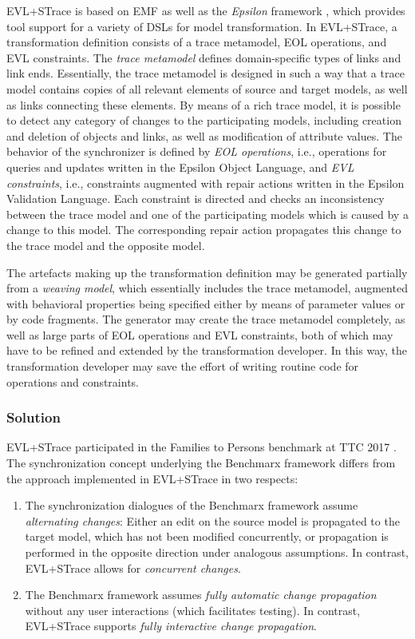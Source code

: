 EVL+STrace is based on EMF as well as the \emph{Epsilon} framework \cite{epsilon}, which provides tool support for a variety of DSLs for model transformation. In EVL+STrace, a transformation definition consists of a trace metamodel, EOL operations, and EVL constraints. The \emph{trace metamodel} defines domain-specific types of links and link ends. Essentially, the trace metamodel is designed in such a way that a trace model contains copies of all relevant elements of source and target models, as well as links connecting these elements. By means of a rich trace model, it is possible to detect any category of changes to the participating models, including creation and deletion of objects and links, as well as modification of attribute values. The behavior of the synchronizer is defined by \emph{EOL operations}, i.e., operations for queries and updates written in the Epsilon Object Language, and \emph{EVL constraints}, i.e., constraints augmented with repair actions written in the Epsilon Validation Language. Each constraint is directed and checks an inconsistency between the trace model and one of the participating models which is caused by a change to this model. The corresponding repair action propagates this change to the trace model and the opposite model.

The artefacts making up the transformation definition may be generated partially from a \emph{weaving model}, which essentially includes the trace metamodel, augmented with behavioral properties being specified either by means of parameter values or by code fragments. The generator may create the trace metamodel completely, as well as large parts of EOL operations and EVL constraints, both of which may have to be refined and extended by the transformation developer. In this way, the transformation developer may save the effort of writing routine code for operations and constraints.

\subsubsection{Solution}
\label{sec:solutionEVL}

EVL+STrace participated in the Families to Persons benchmark at TTC 2017 \cite{Samimi-Dehkordi2017}. The synchronization concept underlying the Benchmarx framework differs from the approach implemented in EVL+STrace in two respects:

\begin{enumerate}
	\item The synchronization dialogues of the Benchmarx framework assume \emph{alternating changes}: Either an edit on the source model is propagated to the target model, which has not been modified concurrently, or propagation is performed in the opposite direction under analogous assumptions. In contrast, EVL+STrace allows for \emph{concurrent changes}.
	\item The Benchmarx framework assumes \emph{fully automatic change propagation} without any user interactions (which facilitates testing). In contrast, EVL+STrace supports \emph{fully interactive change propagation}.
\end{enumerate}

